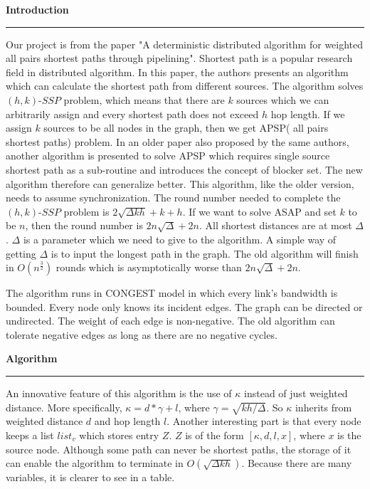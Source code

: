 \documentclass[11pt]{article}  %
\begin{document}
\noindent
{\bf Introduction}

\rule{6in}{.1pt}       %


Our project is from the paper "A deterministic distributed algorithm for weighted all pairs shortest paths through pipelining". Shortest path is a popular research field in distributed algorithm. In this paper, the authors presents an algorithm which can calculate the shortest path from different sources. The algorithm solves $(h,k)$-$SSP$ problem, which means that there are $k$ sources which we can arbitrarily assign and every shortest path does not exceed $h$ hop length. If we assign $k$ sources to be all nodes in the graph, then we get APSP( all pairs shortest paths) problem. In an older paper also proposed by the same authors, another algorithm is presented to solve APSP which requires single source shortest path as a sub-routine and introduces the concept of blocker set. The new algorithm therefore can generalize better. This algorithm, like the older version, needs to assume synchronization. The round number needed to complete the $(h,k)$-$SSP$ problem is $2\sqrt{\Delta kh}+k+h$. If we want to solve ASAP and set $k$ to be $n$, then the round number is $2n\sqrt{\Delta} +2n$. All shortest distances are at most $\Delta$. $\Delta$ is a parameter which we need to give to the algorithm. A simple way of getting $\Delta$ is to input the longest path in the graph. The old algorithm will finish in $O(n^\frac{3}{2})$ rounds which is asymptotically worse than $2n\sqrt{\Delta} +2n$.\par

The algorithm runs in CONGEST model in which every link's bandwidth is bounded. Every node only knows its incident edges. The graph can be directed or undirected. The weight of each edge is non-negative. The old algorithm can tolerate negative edges as long as there are no negative cycles. \par



\noindent
{\bf Algorithm}

\rule{6in}{.1pt}       %

An innovative feature of this algorithm is the use of $\kappa$ instead of just weighted distance. More specifically, $\kappa = d*\gamma + l$, where $\gamma = \sqrt{kh/\Delta}$. So $\kappa$ inherits from weighted distance $d$ and hop length $l$. Another interesting part is that every node keeps a list $list_v$ which stores entry $Z$. $Z$ is of the form $[\kappa, d, l, x]$, where $x$ is the source node. Although some path can never be shortest paths, the storage of it can enable the algorithm to terminate in $O(\sqrt{\Delta kh})$. Because there are many variables, it is clearer to see in a table. \par
\end{document}

